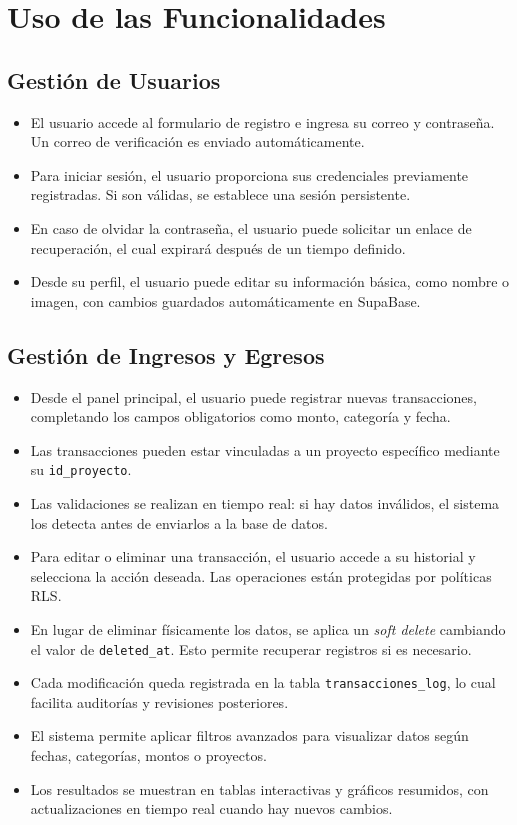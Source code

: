 \section{Uso de las Funcionalidades}

\subsection{Gestión de Usuarios}
\begin{itemize}
    \item El usuario accede al formulario de registro e ingresa su correo y contraseña. Un correo de verificación es enviado automáticamente.
    \item Para iniciar sesión, el usuario proporciona sus credenciales previamente registradas. Si son válidas, se establece una sesión persistente.
    \item En caso de olvidar la contraseña, el usuario puede solicitar un enlace de recuperación, el cual expirará después de un tiempo definido.
    \item Desde su perfil, el usuario puede editar su información básica, como nombre o imagen, con cambios guardados automáticamente en SupaBase.
\end{itemize}

\subsection{Gestión de Ingresos y Egresos}
\begin{itemize}
    \item Desde el panel principal, el usuario puede registrar nuevas transacciones, completando los campos obligatorios como monto, categoría y fecha.
    \item Las transacciones pueden estar vinculadas a un proyecto específico mediante su \texttt{id\_proyecto}.
    \item Las validaciones se realizan en tiempo real: si hay datos inválidos, el sistema los detecta antes de enviarlos a la base de datos.
    \item Para editar o eliminar una transacción, el usuario accede a su historial y selecciona la acción deseada. Las operaciones están protegidas por políticas RLS.
    \item En lugar de eliminar físicamente los datos, se aplica un \textit{soft delete} cambiando el valor de \texttt{deleted\_at}. Esto permite recuperar registros si es necesario.
    \item Cada modificación queda registrada en la tabla \texttt{transacciones\_log}, lo cual facilita auditorías y revisiones posteriores.
    \item El sistema permite aplicar filtros avanzados para visualizar datos según fechas, categorías, montos o proyectos.
    \item Los resultados se muestran en tablas interactivas y gráficos resumidos, con actualizaciones en tiempo real cuando hay nuevos cambios.
\end{itemize}

